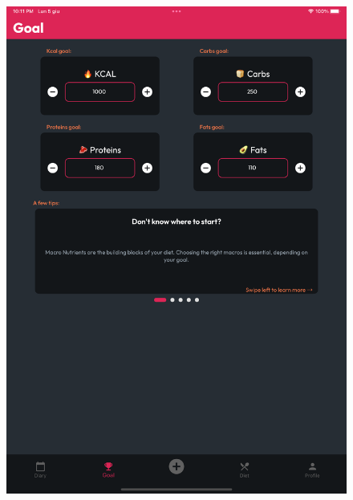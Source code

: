 \documentclass{Configuration_Files/PoliMi3i_thesis}
\begin{document}
\begin{figure}[!h]
  \centering
  \includegraphics[scale=0.1]{Images/Screenshots/Tablet/GoalTablet.png}

\end{figure}
\end{document}
